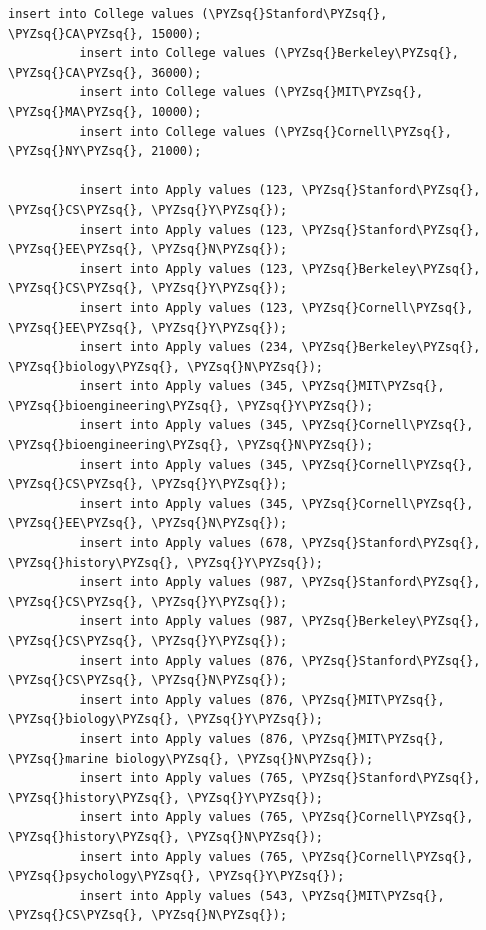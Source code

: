 \documentclass[11pt]{article}
\def\PYZsq{\textquotesingle}%
\def\PYZsq{\char`\'}
\begin{document}
\begin{Verbatim}[commandchars=\\\{\}]
          insert into College values (\PYZsq{}Stanford\PYZsq{}, \PYZsq{}CA\PYZsq{}, 15000);
          insert into College values (\PYZsq{}Berkeley\PYZsq{}, \PYZsq{}CA\PYZsq{}, 36000);
          insert into College values (\PYZsq{}MIT\PYZsq{}, \PYZsq{}MA\PYZsq{}, 10000);
          insert into College values (\PYZsq{}Cornell\PYZsq{}, \PYZsq{}NY\PYZsq{}, 21000);
          
          insert into Apply values (123, \PYZsq{}Stanford\PYZsq{}, \PYZsq{}CS\PYZsq{}, \PYZsq{}Y\PYZsq{});
          insert into Apply values (123, \PYZsq{}Stanford\PYZsq{}, \PYZsq{}EE\PYZsq{}, \PYZsq{}N\PYZsq{});
          insert into Apply values (123, \PYZsq{}Berkeley\PYZsq{}, \PYZsq{}CS\PYZsq{}, \PYZsq{}Y\PYZsq{});
          insert into Apply values (123, \PYZsq{}Cornell\PYZsq{}, \PYZsq{}EE\PYZsq{}, \PYZsq{}Y\PYZsq{});
          insert into Apply values (234, \PYZsq{}Berkeley\PYZsq{}, \PYZsq{}biology\PYZsq{}, \PYZsq{}N\PYZsq{});
          insert into Apply values (345, \PYZsq{}MIT\PYZsq{}, \PYZsq{}bioengineering\PYZsq{}, \PYZsq{}Y\PYZsq{});
          insert into Apply values (345, \PYZsq{}Cornell\PYZsq{}, \PYZsq{}bioengineering\PYZsq{}, \PYZsq{}N\PYZsq{});
          insert into Apply values (345, \PYZsq{}Cornell\PYZsq{}, \PYZsq{}CS\PYZsq{}, \PYZsq{}Y\PYZsq{});
          insert into Apply values (345, \PYZsq{}Cornell\PYZsq{}, \PYZsq{}EE\PYZsq{}, \PYZsq{}N\PYZsq{});
          insert into Apply values (678, \PYZsq{}Stanford\PYZsq{}, \PYZsq{}history\PYZsq{}, \PYZsq{}Y\PYZsq{});
          insert into Apply values (987, \PYZsq{}Stanford\PYZsq{}, \PYZsq{}CS\PYZsq{}, \PYZsq{}Y\PYZsq{});
          insert into Apply values (987, \PYZsq{}Berkeley\PYZsq{}, \PYZsq{}CS\PYZsq{}, \PYZsq{}Y\PYZsq{});
          insert into Apply values (876, \PYZsq{}Stanford\PYZsq{}, \PYZsq{}CS\PYZsq{}, \PYZsq{}N\PYZsq{});
          insert into Apply values (876, \PYZsq{}MIT\PYZsq{}, \PYZsq{}biology\PYZsq{}, \PYZsq{}Y\PYZsq{});
          insert into Apply values (876, \PYZsq{}MIT\PYZsq{}, \PYZsq{}marine biology\PYZsq{}, \PYZsq{}N\PYZsq{});
          insert into Apply values (765, \PYZsq{}Stanford\PYZsq{}, \PYZsq{}history\PYZsq{}, \PYZsq{}Y\PYZsq{});
          insert into Apply values (765, \PYZsq{}Cornell\PYZsq{}, \PYZsq{}history\PYZsq{}, \PYZsq{}N\PYZsq{});
          insert into Apply values (765, \PYZsq{}Cornell\PYZsq{}, \PYZsq{}psychology\PYZsq{}, \PYZsq{}Y\PYZsq{});
          insert into Apply values (543, \PYZsq{}MIT\PYZsq{}, \PYZsq{}CS\PYZsq{}, \PYZsq{}N\PYZsq{});
\end{Verbatim}
\end{document}
